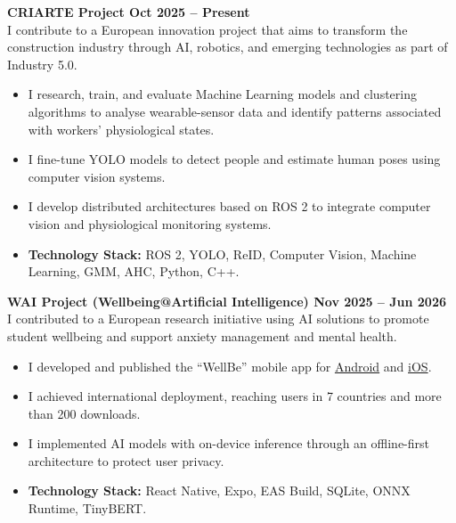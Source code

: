 \documentclass[10pt,a4paper]{article}
\begin{document}
\vspace{4pt}
\textbf{\color{accent}CRIARTE Project \textbar{} Oct 2025 -- Present}\\
I contribute to a European innovation project that aims to transform the construction industry through AI, robotics, and emerging technologies as part of Industry 5.0.
\begin{itemize}
    \item I research, train, and evaluate Machine Learning models and clustering algorithms to analyse wearable-sensor data and identify patterns associated with workers' physiological states.
    \item I fine-tune YOLO models to detect people and estimate human poses using computer vision systems.
    \item I develop distributed architectures based on ROS 2 to integrate computer vision and physiological monitoring systems.
    \item \textbf{Technology Stack:} ROS 2, YOLO, ReID, Computer Vision, Machine Learning, GMM, AHC, Python, C++.
\end{itemize}

\vspace{2pt}
\textbf{\color{accent}WAI Project (Wellbeing@Artificial Intelligence) \textbar{} Nov 2025 -- Jun 2026}\\
I contributed to a European research initiative using AI solutions to promote student wellbeing and support anxiety management and mental health.
\begin{itemize}
    \item I developed and published the ``WellBe'' mobile app for \href{https://play.google.com/store/apps/details?id=com.caloale.waiv1\&hl=en_US}{Android} and \href{https://apps.apple.com/ie/app/wellbe-journaling-app/id6758772082}{iOS}.
    \item I achieved international deployment, reaching users in 7 countries and more than 200 downloads.
    \item I implemented AI models with on-device inference through an offline-first architecture to protect user privacy.
    \item \textbf{Technology Stack:} React Native, Expo, EAS Build, SQLite, ONNX Runtime, TinyBERT.
\end{itemize}
\end{document}
